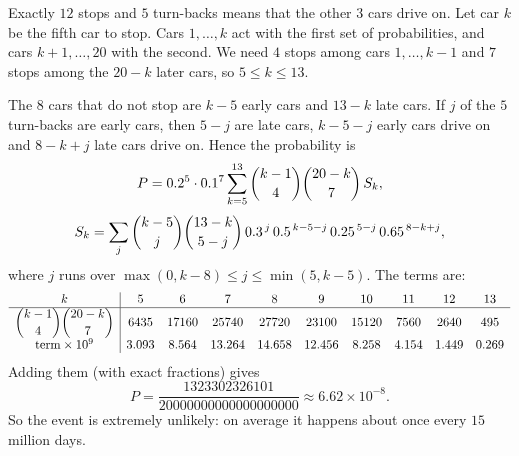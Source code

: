 Exactly $12$ stops and $5$ turn-backs means that the other $3$ cars drive on. Let car $k$ be the fifth car to stop. Cars $1,\dots,k$ act with the first set of probabilities, and cars $k+1,\dots,20$ with the second. We need $4$ stops among cars $1,\dots,k-1$ and $7$ stops among the $20-k$ later cars, so $5\le k\le13$.

The $8$ cars that do not stop are $k-5$ early cars and $13-k$ late cars. If $j$ of the $5$ turn-backs are early cars, then $5-j$ are late cars, $k-5-j$ early cars drive on and $8-k+j$ late cars drive on. Hence the probability is
\[P=0.2^5\cdot0.1^7\sum_{k=5}^{13}\dbinom{k-1}{4}\dbinom{20-k}{7}\,S_k,\]
\[S_k=\sum_{j}\dbinom{k-5}{j}\dbinom{13-k}{5-j}\,0.3^{\,j}\,0.5^{\,k-5-j}\,0.25^{\,5-j}\,0.65^{\,8-k+j},\]
where $j$ runs over $\max(0,k-8)\le j\le\min(5,k-5)$. The terms are:
\[\begin{array}{c|ccccccccc}
k&5&6&7&8&9&10&11&12&13\\\hline
\dbinom{k-1}{4}\dbinom{20-k}{7}&6435&17160&25740&27720&23100&15120&7560&2640&495\\
\text{term}\times10^{9}&3.093&8.564&13.264&14.658&12.456&8.258&4.154&1.449&0.269
\end{array}\]
Adding them (with exact fractions) gives
\[P=\boxed{\dfrac{1323302326101}{20000000000000000000}}\approx6.62\times10^{-8}.\]
So the event is extremely unlikely: on average it happens about once every $15$ million days.
